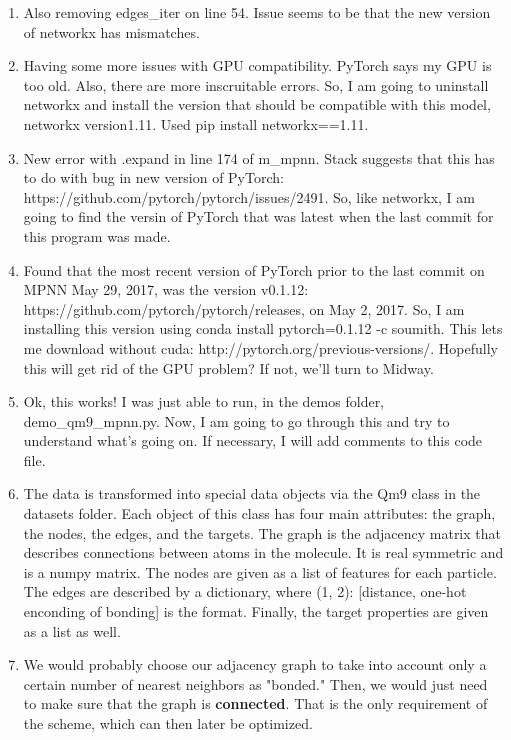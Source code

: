 \documentclass[12pt,reqno]{amsart}
\numberwithin{equation}{section}
\begin{document}
\begin{enumerate}
\item Also removing edges\_iter on line 54.  Issue seems to be that the new version of networkx has mismatches.  
\item Having some more issues with GPU compatibility.  PyTorch says my GPU is too old.  Also, there are more inscruitable errors.  So, I am going to uninstall networkx and install the version that should be compatible with this model, networkx version1.11.  Used pip install networkx==1.11. 
\item New error with .expand in line 174 of m\_mpnn.  Stack suggests that this has to do with bug in new version of PyTorch: https://github.com/pytorch/pytorch/issues/2491.  So, like networkx, I am going to find the versin of PyTorch that was latest when the last commit for this program was made. 
\item Found that the most recent version of PyTorch prior to the last commit on MPNN May 29, 2017, was the version v0.1.12: https://github.com/pytorch/pytorch/releases, on May 2, 2017.  So, I am installing this version using conda install pytorch=0.1.12 -c soumith.  This lets me download without cuda: http://pytorch.org/previous-versions/.  Hopefully this will get rid of the GPU problem?  If not, we'll turn to Midway.  
\item Ok, this works!  I was just able to run, in the demos folder, demo\_qm9\_mpnn.py.  Now, I am going to go through this and try to understand what's going on.  If necessary, I will add comments to this code file.  
\item The data is transformed into special data objects via the Qm9 class in the datasets folder.  Each object of this class has four main attributes: the graph, the nodes, the edges, and the targets.  The graph is the adjacency matrix that describes connections between atoms in the molecule.  It is real symmetric and is a numpy matrix.  The nodes are given as a list of features for each particle.  The edges are described by a dictionary, where (1, 2): [distance, one-hot enconding of bonding] is the format.  Finally, the target properties are given as a list as well.    
\item We would probably choose our adjacency graph to take into account only a certain number of nearest neighbors as "bonded."  Then, we would just need to make sure that the graph is \textbf{connected}.  That is the only requirement of the scheme, which can then later be optimized.  
\end{enumerate}
\end{document}
